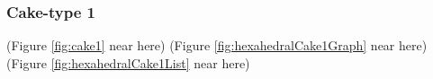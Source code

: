 \documentclass[suppldata, dvipdfmx]{interact}
\theoremstyle{plain}%
\theoremstyle{definition}
\theoremstyle{remark}
\theoremstyle{problemstyle}
\begin{document}


\subsubsection{Cake-type 1}

\noindent(Figure \ref{fig:cake1} near here)
(Figure \ref{fig:hexahedralCake1Graph} near here)\\
(Figure \ref{fig:hexahedralCake1List}
 near here)
\end{document}
